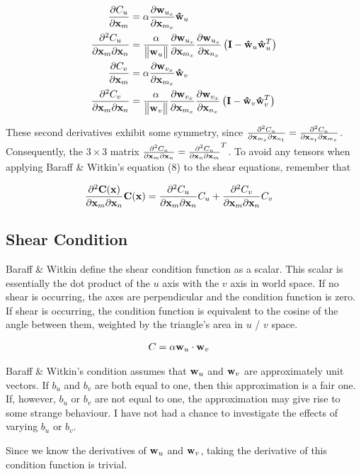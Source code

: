 \documentclass[twocolumn]{article}
\newcommand{\norm}[1]{\begin{Vmatrix}#1\end{Vmatrix}}
\newcommand{\pfrac}[2]{
    \frac{\partial #1}{\partial #2}
}
\newcommand{\pfractwo}[3]{
    \frac{\partial^2 #1}{\partial #2 \partial #3}
}
\newcommand{\I}{{\bf I}}
\newcommand{\x}{{\bf x}}
\newcommand{\xm}{\x_m}
\newcommand{\xms}{\x_{m_s}}
\newcommand{\xmx}{\x_{m_x}}
\newcommand{\xn}{\x_n}
\newcommand{\xnt}{\x_{n_t}}
\newcommand{\xnx}{\x_{n_x}}
\newcommand{\C}{{\bf C}}
\newcommand{\Cu}{C_u}
\newcommand{\Cv}{C_v}
\newcommand{\w}{{\bf w}}
\newcommand{\what}{{\bf {\hat w}}}
\newcommand{\wu}{\w_u}
\newcommand{\wux}{\w_{u_x}}
\newcommand{\whatu}{\what_u}
\newcommand{\wv}{\w_v}
\newcommand{\wvx}{\w_{v_x}}
\newcommand{\whatv}{\what_v}
\begin{document}
\begin{align}
\pfrac{\Cu}{\xm} &= \alpha \pfrac{\wux}{\xmx} \whatu \\
%
\pfractwo{\Cu}{\xm}{\xn} &=
   \frac{\alpha}{\norm{\wu}}
   \pfrac{\wux}{\xmx} \pfrac{\wux}{\xnx}
   \left( \I - \whatu \whatu^T \right) \\
%
\pfrac{\Cv}{\xm} &= \alpha \pfrac{\wvx}{\xmx} \whatv \\
%
\pfractwo{\Cv}{\xm}{\xn} &=
   \frac{\alpha}{\norm{\wv}}
   \pfrac{\wvx}{\xmx} \pfrac{\wvx}{\xnx}
   \left( \I - \whatv \whatv^T \right)
\end{align}

These second derivatives exhibit some symmetry, since
$\pfractwo{\Cu}{\xms}{\xnt} = \pfractwo{\Cu}{\xnt}{\xms}$.
Consequently, the $3\times3$ matrix
$\pfractwo{\Cu}{\xm}{\xn} = \pfractwo{\Cu}{\xn}{\xm}^T$.
To avoid any tensors when applying Baraff \& Witkin's equation (8) to the
shear equations, remember that

\begin{align}
\pfractwo{\C(\x)}{\xm}{\xn}\C(\x)
&=  \pfractwo{\Cu}{\xm}{\xn}\Cu + \pfractwo{\Cv}{\xm}{\xn}\Cv
\end{align}

\subsection{Shear Condition}

Baraff \& Witkin define the shear condition function as a scalar. This
scalar is essentially the dot product of the $u$ axis with the $v$ axis in
world space. If no shear is occurring, the axes are perpendicular and the
condition function is zero. If shear is occurring, the condition function is
equivalent to the cosine of the angle between them, weighted by the triangle's
area in $u$ / $v$ space.

\begin{align}
\label{eq:shear}
C &= \alpha \wu \cdot \wv
\end{align}

Baraff \& Witkin's condition assumes that $\wu$ and $\wv$ are approximately
unit vectors. If $b_u$ and $b_v$ are both equal to one, then this approximation
is a fair one. If, however, $b_u$ or $b_v$ are not equal to one, the
approximation may give rise to some strange behaviour. I have not had a chance
to investigate the effects of varying $b_u$ or $b_v$.

Since we know the derivatives of $\wu$ and $\wv$, taking the derivative of
this condition function is trivial.
\end{document}
